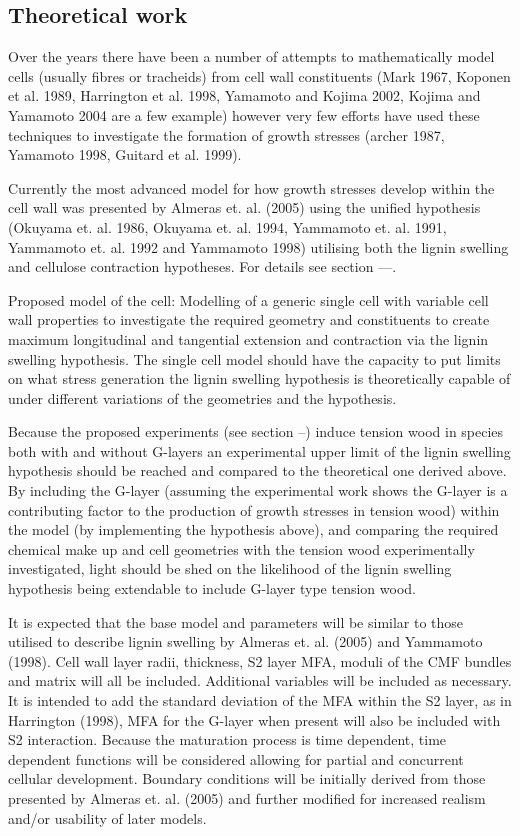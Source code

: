 \documentclass{article}
\begin{document}
\subsection{Theoretical work}
Over the years there have been a number of attempts to mathematically model
cells (usually fibres or tracheids) from cell wall constituents (Mark
1967, Koponen et al. 1989, Harrington et al. 1998, Yamamoto and Kojima 2002,
Kojima and Yamamoto 2004 are a few example) however very few efforts have used
these techniques to investigate the formation of growth stresses (archer 1987,
Yamamoto 1998, Guitard et al. 1999).

Currently the most advanced model for how growth stresses develop within the
cell wall was presented by Almeras et. al. (2005) using the unified hypothesis
(Okuyama et. al. 1986, Okuyama et. al. 1994, Yammamoto et. al. 1991, Yammamoto
et. al. 1992 and Yammamoto 1998) utilising both the lignin swelling and
cellulose contraction hypotheses. For details see section ---.

Proposed model of the cell:
Modelling of a generic single cell with variable cell wall properties to
investigate the required geometry and constituents to create maximum
longitudinal and tangential extension and contraction via the lignin swelling
hypothesis. The single cell model should have the capacity to put limits on what
stress generation the lignin swelling hypothesis is theoretically capable of
under different variations of the geometries and the hypothesis.

Because the proposed experiments (see section --) induce tension wood in species
both with and without G-layers an experimental upper limit of the lignin
swelling hypothesis should be reached and compared to the theoretical one
derived above. By including the G-layer (assuming the experimental work shows
the G-layer is a contributing factor to the production of growth stresses in
tension wood) within the model (by implementing the hypothesis above), and
comparing the required chemical make up and cell geometries with the
tension wood experimentally investigated, light should be shed on the likelihood
of the lignin swelling hypothesis being extendable to include G-layer type
tension wood.

It is expected that the base model and parameters will be similar to
those utilised to describe lignin swelling by Almeras  et. al. (2005) and
Yammamoto (1998). Cell wall layer radii, thickness, S2 layer MFA, moduli of
the CMF bundles and matrix will all be included. Additional variables will
be included as necessary. It is intended to add the standard deviation of the
MFA within the S2 layer, as in Harrington (1998), MFA for the G-layer when
present will also be included with S2 interaction. Because the
maturation process is time dependent, time dependent functions will be
considered allowing for partial and concurrent cellular development. Boundary
conditions will be initially derived from those presented by Almeras et. al.
(2005) and further modified for increased realism and/or usability of later
models.
\end{document}
